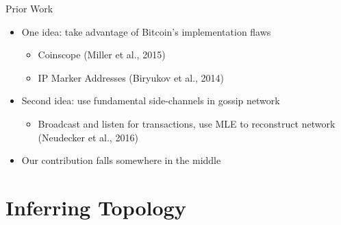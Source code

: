 \documentclass{beamer}
\begin{document}
\begin{frame}{Prior Work}

\begin{itemize}
\item One idea: take advantage of Bitcoin's implementation flaws\pause
\begin{itemize}
    \item Coinscope (Miller et al., 2015)\pause
    \item IP Marker Addresses (Biryukov et al., 2014)
\end{itemize}\pause
\item Second idea: use fundamental side-channels in gossip network\pause
\begin{itemize}
    \item Broadcast and listen for transactions, use MLE to reconstruct network (Neudecker et al., 2016)
\end{itemize}\pause
\item Our contribution falls somewhere in the middle
\end{itemize}

\end{frame}

% 
% 
% 

\section{Inferring Topology}
\end{document}
